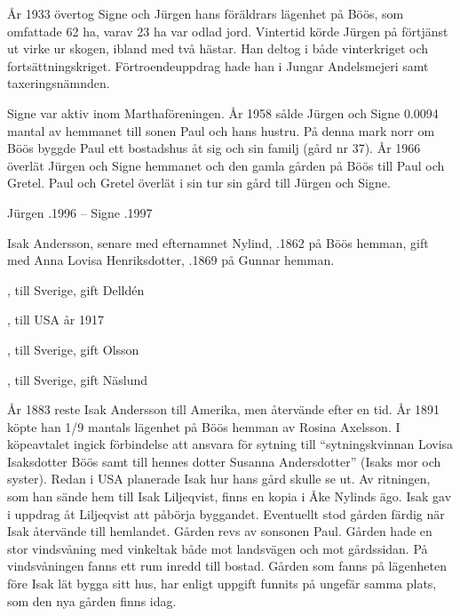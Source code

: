 År 1933 övertog Signe och Jürgen hans föräldrars lägenhet på Böös, som omfattade 62 ha, varav 23 ha var odlad jord. Vintertid körde Jürgen på förtjänst ut virke ur skogen, ibland med två hästar. Han deltog i både vinterkriget och fortsättningskriget. Förtroendeuppdrag hade han i Jungar Andelsmejeri samt taxeringsnämnden.

Signe var aktiv inom Marthaföreningen. År 1958 sålde Jürgen och Signe 0.0094 mantal av hemmanet till sonen Paul och hans hustru. På denna mark norr om Böös byggde Paul  ett bostadshus åt sig och sin familj (gård nr 37). År 1966 överlät Jürgen och Signe hemmanet och den gamla gården på Böös till Paul och Gretel. Paul och Gretel  överlät i sin tur sin gård till Jürgen och Signe.

Jürgen .1996  --  Signe .1997


Isak Andersson, senare med efternamnet Nylind, .1862 på Böös hemman, gift med Anna Lovisa Henriksdotter, .1869 på Gunnar hemman.
\begin{jhchildren}
  \item {}, till Sverige, gift Delldén
  \item {}, till USA år 1917
  \item {}
  \item {}
  \item {}
  \item {}
  \item {}, till Sverige, gift Olsson
  \item {}, till Sverige, gift Näslund
\end{jhchildren}
År 1883 reste Isak Andersson till Amerika, men återvände efter en tid. År 1891 köpte han 1/9 mantals lägenhet på Böös hemman av Rosina Axelsson. I köpeavtalet ingick förbindelse att ansvara för sytning till ``sytningskvinnan Lovisa Isaksdotter Böös samt till hennes dotter Susanna Andersdotter'' (Isaks mor och syster). Redan i USA planerade Isak hur hans gård skulle se ut. Av ritningen, som han sände	hem till Isak Liljeqvist, finns en kopia i Åke Nylinds ägo. Isak gav i uppdrag åt Liljeqvist att påbörja byggandet. Eventuellt stod gården	färdig när Isak återvände till hemlandet. Gården revs av sonsonen Paul. Gården hade en stor vindsvåning med vinkeltak både mot landsvägen och mot gårdssidan. På vindsvåningen fanns ett rum inredd till bostad. Gården som fanns på lägenheten före Isak lät bygga sitt hus, har enligt uppgift funnits på ungefär samma plats, som den nya gården finns idag.

